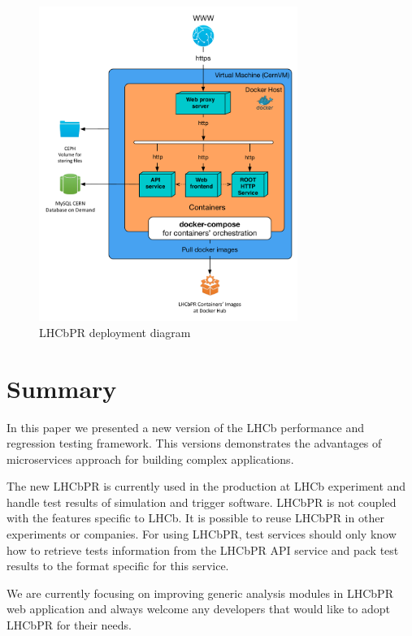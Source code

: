 \documentclass[a4paper]{jpconf}
\begin{document}
\begin{figure}[H]
\begin{minipage}{\textwidth}
\includegraphics[width=0.75\textwidth]{figs/lhcbpr-nodes.pdf}
\caption{\label{fig:nodes}LHCbPR deployment diagram}
\end{minipage}
\end{figure}

\section{Summary}
In this paper we presented a new version of the LHCb performance and regression
testing framework. This versions demonstrates the advantages of microservices
approach for building complex applications.

The new LHCbPR is currently used in the production at LHCb experiment and handle
test results of simulation and trigger software. LHCbPR is not coupled with the
features specific to LHCb. It is possible to reuse LHCbPR in other experiments
or companies. For using LHCbPR, test services should only know how to retrieve
tests information from the LHCbPR API service and pack test results to the
format specific for this service.

We are currently focusing on improving generic analysis modules in LHCbPR web
application and always welcome any developers that would like to adopt LHCbPR
for their needs.
\end{document}
